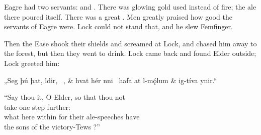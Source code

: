 Eagre had two servants:  and . There was glowing gold used instead of fire; the ale there poured itself. There was a great . Men greatly praised how good the servants of Eagre were. Lock could not stand that, and he slew Femfinger.

Then the Ease shook their shields and screamed at Lock, and chased him away to the forest, but then they went to drink. Lock came back and found Elder outside; Lock greeted him:\epb\epg

\sectionline

\bvg
\bva „Seg þú þat, ldir, \hld\ , &
hvat hér nni \hld\ hafa at l-mǫ́lum &
\ind {}ig-tíva ynir.“\eva

\bvb “Say thou it, O Elder, so that thou not \\
take one step further: \\
what here within for their ale-speeches have \\
the sons of the victory-Tews ?”\evb
\evg


